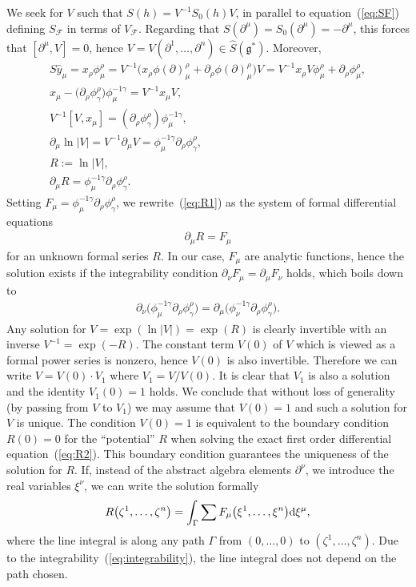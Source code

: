 \documentclass[10pt,a4paper]{amsart}
\def\gg{\mathfrak{g}}
\numberwithin{equation}{section}
\begin{document}
We seek for $V$ such that $S(h) = V^{-1}S_0(h)V$, in parallel to equation~(\ref{eq:SF}) defining $S_{\mathcal{F}}$ in terms of $V_{\mathcal{F}}$. Regarding that $S(\partial^\mu) = S_0(\partial^\mu)= -\partial^\mu$, this forces that $[\partial^\mu,V] = 0$, hence $V = V(\partial^1,\dots,\partial^n)\in\hat{S}(\gg^*)$. Moreover,
\begin{gather}
S \hat{y}_\mu = x_\rho\phi^\rho_\mu = V^{-1}\big(x_\rho\phi(\partial)^\rho_\mu + \partial_\rho\phi(\partial)^\rho_\mu\big)V = V^{-1}x_\rho V\phi^\rho_\mu + \partial_\rho\phi^\rho_\mu,\nonumber\\
x_\mu - \big(\partial_\rho \phi^\rho_\gamma\big)\phi^{-1\gamma}_\mu = V^{-1} x_\mu V,\nonumber\\
V^{-1} [V,x_\mu] = (\partial_\rho\phi^\rho_\gamma)\phi^{-1\gamma}_\mu,\nonumber\\
\partial_\mu{\ln|V|} = V^{-1}\partial_\mu V = \phi^{-1\gamma}_\mu\partial_\rho\phi^\rho_\gamma,\nonumber\\
R := \ln|V|,\nonumber\\
\partial_\mu R = \phi^{-1\gamma}_\mu\partial_\rho\phi^\rho_\gamma.\label{eq:R1}
\end{gather}
Setting $F_\mu = \phi^{-1\gamma}_\mu\partial_\rho\phi^\rho_\gamma$, we rewrite~(\ref{eq:R1}) as the system of formal differential equations
\begin{gather}\label{eq:R2}
\partial_\mu R = F_\mu
\end{gather}
for an unknown formal series $R$. In our case, $F_\mu$ are analytic functions, hence the solution exists if the integrability condition $\partial_\nu F_\mu= \partial_\mu F_\nu$ holds, which boils down to
\begin{gather}\label{eq:integrability}
\partial_\nu\big(\phi^{-1\gamma}_\mu\partial_\rho\phi^\rho_\gamma\big) = \partial_\mu\big(\phi^{-1\gamma}_\nu\partial_\rho\phi^\rho_\gamma\big).
\end{gather}
Any solution for $V = \exp(\ln|V|) = \exp(R)$ is clearly invertible with an inverse $V^{-1} = \exp(-R)$. The constant term $V(0)$ of $V$ which is viewed as a formal power series is nonzero, hence $V(0)$ is also invertible. Therefore we can write $V = V(0)\cdot V_1$ where $V_1 = V/V(0)$. It is clear that $V_1$ is also a solution and the identity $V_1(0) = 1$ holds. We conclude that without loss of generality (by passing from $V$ to $V_1$) we may assume that $V(0) = 1$ and such a solution for $V$ is unique. The condition $V(0)=1$ is equivalent to the boundary condition $R(0) = 0$ for the ``potential'' $R$ when solving the exact first order differential equation~(\ref{eq:R2}). This boundary condition guarantees the uniqueness of the solution for $R$. If, instead of the abstract algebra elements $\partial^\nu$, we introduce the real variables $\xi^\nu$, we can write the solution formally
\begin{gather*}
R\big(\zeta^1,\dots,\zeta^n\big) = \int_\Gamma \sum F_\mu\big(\xi^1,\dots,\xi^n\big) {\rm d} \xi^\mu,
\end{gather*}
where the line integral is along any path $\Gamma$ from $(0,\dots,0)$ to $(\zeta^1,\dots,\zeta^n)$. Due to the integrability~(\ref{eq:integrability}), the line integral does not depend on the path chosen.
\end{document}
